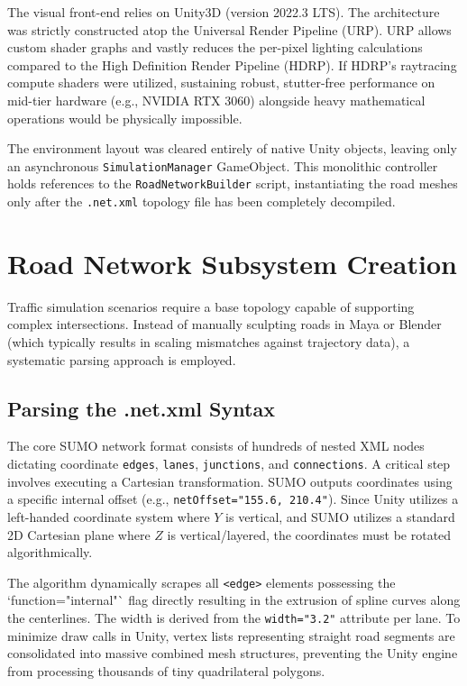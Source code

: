 The visual front-end relies on Unity3D (version 2022.3 LTS). The architecture was strictly constructed atop the Universal Render Pipeline (URP). URP allows custom shader graphs and vastly reduces the per-pixel lighting calculations compared to the High Definition Render Pipeline (HDRP). If HDRP's raytracing compute shaders were utilized, sustaining robust, stutter-free performance on mid-tier hardware (e.g., NVIDIA RTX 3060) alongside heavy mathematical operations would be physically impossible.

The environment layout was cleared entirely of native Unity objects, leaving only an asynchronous \texttt{SimulationManager} GameObject. This monolithic controller holds references to the \texttt{RoadNetworkBuilder} script, instantiating the road meshes only after the \texttt{.net.xml} topology file has been completely decompiled.

\section{Road Network Subsystem Creation}

Traffic simulation scenarios require a base topology capable of supporting complex intersections. Instead of manually sculpting roads in Maya or Blender (which typically results in scaling mismatches against trajectory data), a systematic parsing approach is employed. 

\subsection{Parsing the .net.xml Syntax}

The core SUMO network format consists of hundreds of nested XML nodes dictating coordinate \texttt{edges}, \texttt{lanes}, \texttt{junctions}, and \texttt{connections}. A critical step involves executing a Cartesian transformation. SUMO outputs coordinates using a specific internal offset (e.g., \texttt{netOffset="155.6, 210.4"}). Since Unity utilizes a left-handed coordinate system where $Y$ is vertical, and SUMO utilizes a standard 2D Cartesian plane where $Z$ is vertical/layered, the coordinates must be rotated algorithmically.

The algorithm dynamically scrapes all \texttt{<edge>} elements possessing the `function="internal"` flag directly resulting in the extrusion of spline curves along the centerlines. The width is derived from the \texttt{width="3.2"} attribute per lane. To minimize draw calls in Unity, vertex lists representing straight road segments are consolidated into massive combined mesh structures, preventing the Unity engine from processing thousands of tiny quadrilateral polygons.

